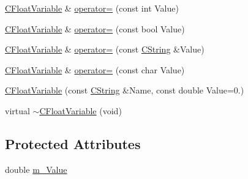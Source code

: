 \begin{DoxyCompactItemize}
\item 
\hyperlink{classCFloatVariable}{C\-Float\-Variable} \& \hyperlink{classCFloatVariable_a262cf84d4b36a6632a79fd147cedc743}{operator=} (const int Value)
\item 
\hyperlink{classCFloatVariable}{C\-Float\-Variable} \& \hyperlink{classCFloatVariable_ae093d9e1bcc2322935e581573686f6d0}{operator=} (const bool Value)
\item 
\hyperlink{classCFloatVariable}{C\-Float\-Variable} \& \hyperlink{classCFloatVariable_a5734706330eef91580b2bbfa9ed139e5}{operator=} (const \hyperlink{classCString}{C\-String} \&Value)
\item 
\hyperlink{classCFloatVariable}{C\-Float\-Variable} \& \hyperlink{classCFloatVariable_af60a68bcc968297b8221f34332089497}{operator=} (const char Value)
\item 
\hyperlink{classCFloatVariable_a4edea7981c2f4d19f98e8227181dff73}{C\-Float\-Variable} (const \hyperlink{classCString}{C\-String} \&Name, const double Value=0.)
\item 
virtual \hyperlink{classCFloatVariable_a340049936766ef7db8653df3ecec1c19}{$\sim$\-C\-Float\-Variable} (void)
\end{DoxyCompactItemize}
\subsection*{Protected Attributes}
\begin{DoxyCompactItemize}
\item 
double \hyperlink{classCFloatVariable_aa25bca6796483d1055947eceb2aff411}{m\-\_\-\-Value}
\end{DoxyCompactItemize}


